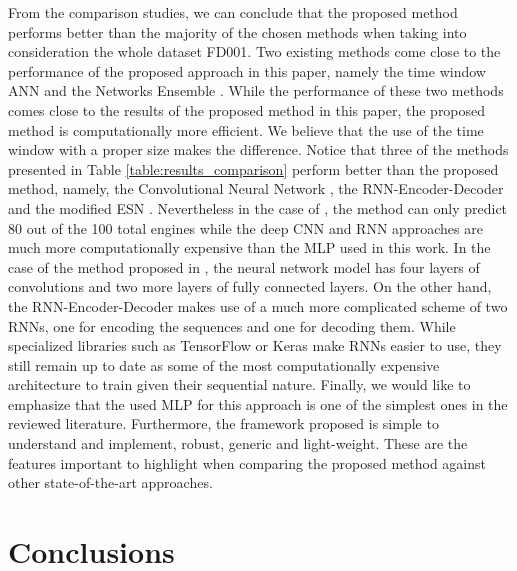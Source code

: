 \documentclass[preprint,12pt]{elsarticle}%
\begin{document}
From the comparison studies, we can conclude that
the proposed method performs better than the majority of the chosen methods
when taking into consideration the whole dataset FD001. Two existing methods
come close to the performance of the proposed approach in this paper, namely
the time window ANN \cite{Lim2016} and the Networks Ensemble \cite{Zhang2016}.
While the performance of these two methods comes close to the results of the
proposed method in this paper, the proposed method is computationally more 
efficient. We believe that the use of the time window  with a proper size makes the difference. Notice that three of the methods presented in Table \ref{table:results_comparison} perform better than the proposed method, namely, the Convolutional Neural Network \cite{Li2018}, the RNN-Encoder-Decoder \cite{Malhorta2016} and the modified ESN \cite{Peng2012}. Nevertheless in the case of \cite{Peng2012}, the method can only predict 80 out of the 100 total engines while the deep CNN \cite{Li2018} and RNN \cite{Malhorta2016} approaches are much more computationally expensive than the MLP used in this work. In the case of the method proposed in \cite{Li2018}, the neural network model has four layers of convolutions and two more layers of fully connected layers. On the other hand, the RNN-Encoder-Decoder \cite{Malhorta2016} makes use of a much more complicated scheme of two RNNs, one for encoding the sequences and one for decoding them. While specialized libraries such as TensorFlow or Keras make RNNs easier to use, they still remain up to date as some of the most computationally expensive architecture to train given their sequential nature. Finally, we would like to emphasize that the used MLP for this approach is one of the simplest ones in the reviewed literature. Furthermore, the framework proposed is simple to understand and implement, robust, generic and light-weight. These are the features 
important to highlight when comparing the proposed method against other
state-of-the-art approaches.

\section{Conclusions}

\label{sec:conclusions}
\end{document}
